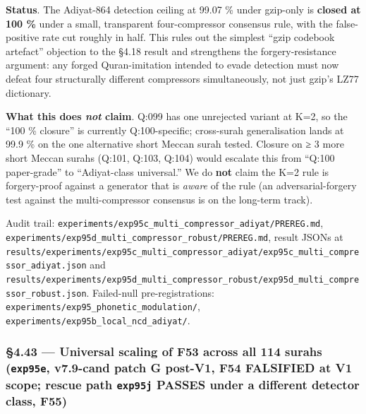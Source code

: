 \documentclass[
]{article}
\begin{document}
\textbf{Status}. The Adiyat-864 detection ceiling at 99.07 \% under
gzip-only is \textbf{closed at 100 \%} under a small, transparent
four-compressor consensus rule, with the false-positive rate cut roughly
in half. This rules out the simplest ``gzip codebook artefact''
objection to the §4.18 result and strengthens the forgery-resistance
argument: any forged Quran-imitation intended to evade detection must
now defeat four structurally different compressors simultaneously, not
just gzip's LZ77 dictionary.

\textbf{What this does \emph{not} claim}. Q:099 has one unrejected
variant at K=2, so the ``100 \% closure'' is currently Q:100-specific;
cross-surah generalisation lands at 99.9 \% on the one alternative short
Meccan surah tested. Closure on ≥ 3 more short Meccan surahs (Q:101,
Q:103, Q:104) would escalate this from ``Q:100 paper-grade'' to
``Adiyat-class universal.'' We do \textbf{not} claim the K=2 rule is
forgery-proof against a generator that is \emph{aware} of the rule (an
adversarial-forgery test against the multi-compressor consensus is on
the long-term track).

Audit trail:
\texttt{experiments/exp95c\_multi\_compressor\_adiyat/PREREG.md},
\texttt{experiments/exp95d\_multi\_compressor\_robust/PREREG.md}, result
JSONs at
\texttt{results/experiments/exp95c\_multi\_compressor\_adiyat/exp95c\_multi\_compressor\_adiyat.json}
and
\texttt{results/experiments/exp95d\_multi\_compressor\_robust/exp95d\_multi\_compressor\_robust.json}.
Failed-null pre-registrations:
\texttt{experiments/exp95\_phonetic\_modulation/},
\texttt{experiments/exp95b\_local\_ncd\_adiyat/}.

\subsubsection{\texorpdfstring{§4.43 --- Universal scaling of F53 across
all 114 surahs (\texttt{exp95e}, v7.9-cand patch G post-V1, \textbf{F54
FALSIFIED at V1 scope}; rescue path \texttt{exp95j} PASSES under a
different detector class,
\textbf{F55})}{§4.43 --- Universal scaling of F53 across all 114 surahs (exp95e, v7.9-cand patch G post-V1, F54 FALSIFIED at V1 scope; rescue path exp95j PASSES under a different detector class, F55)}}\label{universal-scaling-of-f53-across-all-114-surahs-exp95e-v7.9-cand-patch-g-post-v1-f54-falsified-at-v1-scope-rescue-path-exp95j-passes-under-a-different-detector-class-f55}
\end{document}
